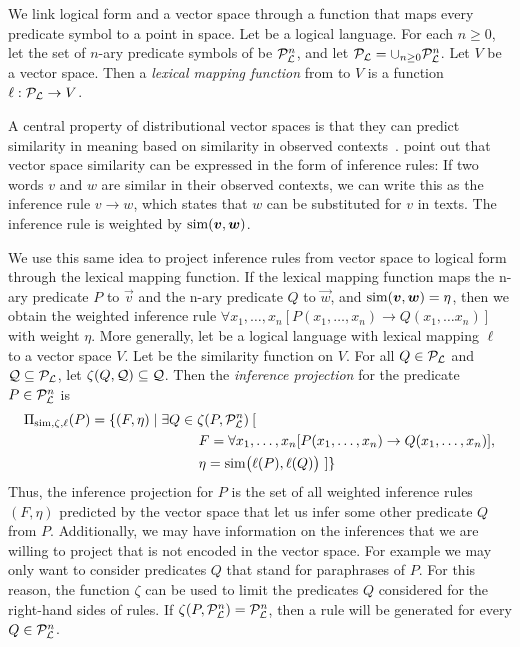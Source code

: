 We link logical form and a vector space through a function that maps every
predicate symbol to a point in space. Let \loglang be a logical language. For
each $n \ge 0$, let the set of $n$-ary predicate symbols of \loglang be
${\cal{P}}_{{\cal{L}}}^n$, and let ${\cal{P}}_{{\cal{L}}} = \cup_{n \ge 0}
{\cal{P}}_{{\cal{L}}}^n$. Let $V$ be a vector space. Then a \emph{lexical mapping
function} from \loglang to $V$ is a function $\ell:
{\cal{P}}_{{\cal{L}}} \to V$.

A central property of distributional vector spaces is that they can predict
similarity in meaning based on similarity in observed
contexts~\citep{harris:wj1954}. \citet{lin:nlej2001} point out that vector space
similarity can be expressed in the form of inference rules: If two words $v$ and
$w$ are similar in their observed contexts, we can write this as the inference
rule $v \to w$, which states that $w$ can be substituted for $v$ in texts. The
inference rule is weighted by $\simfunc(\vec v, \vec w)$.

We use this same idea to project inference rules from vector space to logical
form through the lexical mapping function. If the lexical mapping function maps
the n-ary predicate $P$ to $\vec v$ and the n-ary predicate $Q$ to $ \vec w$,
and $\simfunc(\vec v, \vec w) = \eta$, then we obtain the weighted inference
rule $\forall x_1, \ldots, x_n[ P(x_1, \ldots, x_n) \to Q(x_1, \ldots x_n) ]$
with weight $\eta$. More generally, let \loglang be a logical language with
lexical mapping $\ell$ to a vector space $V$. Let \simfunc{} be the similarity
function on $V$. For all $Q \in {\cal{P}}_{{\cal{L}}}$ and ${\cal Q} \subseteq
{\cal{P}}_{{\cal{L}}}$, let $\zeta(Q, {\cal Q}) \subseteq {\cal Q}$. Then the
\emph{inference projection} for the predicate $P \in {\cal{P}}_{{\cal{L}}}^n$ is
\begin{align*}
&\Pi_{\simfunc, \zeta, \ell}(P) = \{ (F, \eta) \mid \exists Q \in \zeta(P, \predsym{\loglang}^n)\:[ \\ 
& \hspace{125px} F = \forall x_1, \ldots, x_n[P(x_1, \ldots, x_n) \to Q(x_1, \ldots, x_n)], \\
& \hspace{125px} \eta = \simfunc\big(\ell(P), \ell(Q)\big) ~] \}
\end{align*}
Thus, the inference projection for $P$ is the set of all weighted inference
rules $(F, \eta)$ predicted by the vector space that let us infer some
other predicate $Q$ from $P$. Additionally, we may have information on the 
inferences that we are willing to project that is not encoded in the vector 
space. For example we may only want to consider
predicates $Q$ that stand for paraphrases of $P$. For this reason, the
function $\zeta$ can be used to limit the predicates $Q$ considered for the right-hand
sides of rules. If $\zeta(P, {\cal{P}}_{{\cal{L}}}^n) =
{\cal{P}}_{{\cal{L}}}^n$, then a rule will
be generated for every $Q \in {\cal{P}}_{{\cal{L}}}^n$. 


